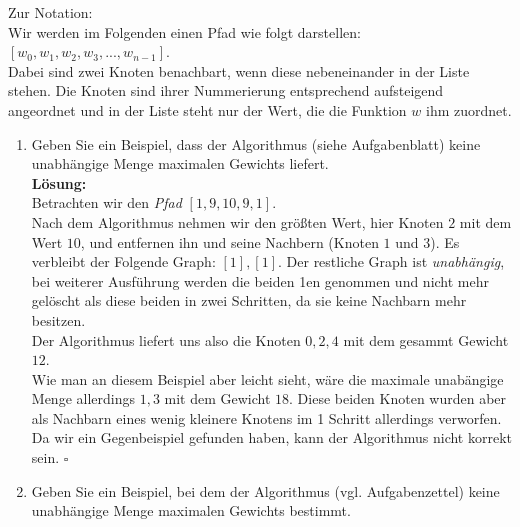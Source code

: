\documentclass[11pt,a4paper,ngerman]{article}
\begin{document}
Zur Notation:\\
Wir werden im Folgenden einen Pfad wie folgt darstellen:\\
$[w_0, w_1, w_2, w_3 , ... , w_{n-1}]$.\\
Dabei sind zwei Knoten benachbart, wenn diese nebeneinander in der Liste stehen. Die Knoten sind ihrer Nummerierung entsprechend aufsteigend angeordnet und in der Liste steht nur der Wert, die die Funktion $w$ ihm zuordnet.
\begin{enumerate}[\bfseries (a)]


\item Geben Sie ein Beispiel, dass der Algorithmus (siehe Aufgabenblatt) keine unabhängige Menge maximalen Gewichts liefert.\\

\textbf{Lösung:}\\
Betrachten wir den \emph{Pfad} $[1, 9 , 10 , 9 , 1]$.\\

Nach dem Algorithmus nehmen wir den größten Wert, hier Knoten $2$ mit dem Wert $10$, und entfernen ihn und seine Nachbern (Knoten $1$ und $3$). Es verbleibt der Folgende Graph: $[1], [1]$. Der restliche Graph ist \emph{unabhängig}, bei weiterer Ausführung werden die beiden 1en genommen und nicht mehr gelöscht als diese beiden in zwei Schritten, da sie keine Nachbarn mehr besitzen.\\

Der Algorithmus liefert uns also die Knoten $0,2,4$ mit dem gesammt Gewicht $12$.\\
Wie man an diesem Beispiel aber leicht sieht, wäre die maximale unabängige Menge allerdings $1,3$ mit dem Gewicht $18$. Diese beiden Knoten wurden aber als Nachbarn eines wenig kleinere Knotens im 1 Schritt allerdings verworfen.\\

Da wir ein Gegenbeispiel gefunden haben, kann der Algorithmus nicht korrekt sein. \mbox{} \hfill $\square$


\item Geben Sie ein Beispiel, bei dem der Algorithmus (vgl. Aufgabenzettel) keine unabhängige Menge maximalen Gewichts bestimmt.\\

\pagebreak


\end{enumerate}
\end{document}
